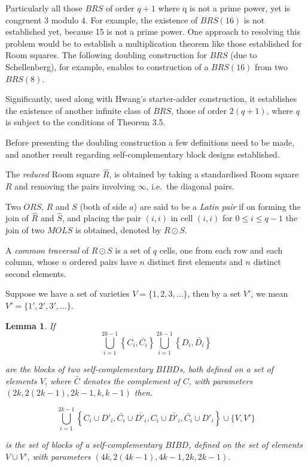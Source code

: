 \documentclass[
  11pt,
  a4paper]{book}
\newtheorem{lemma}[theorem]{Lemma}
\begin{document}
Particularly all those \(BRS\) of order \(q+1\) where q is not a
prime power, yet is congruent 3 modulo 4. For example, the
existence of \(BRS(16)\) is not established yet, because 15 is
not a prime power. One approach to resolving this problem
would be to establish a multiplication theorem like those
established for Room squares. The following doubling
construction for \(BRS\) (due to Schellenberg), for example,
enables to construction of a \(BRS(16)\) from two \(BRS(8)\).

Significantly, used along with Hwang's starter-adder
construction, it establishes the existence of another
infinite class of \(BRS\), those of order \(2(q+1)\), where \(q\)
is subject to the conditions of Theorem 3.5.

Before presenting the doubling construction a few
definitions need to be made, and another result regarding
self-complementary block designs established.

The \emph{reduced} Room square \(\hat{R}\), is obtained by taking a
standardised Room square \(R\) and removing the pairs
involving \(\infty\), i.e.~the diagonal pairs.

Two \(ORS\), \(R\) and \(S\) (both of side \(a\)) are said to be a
\emph{Latin pair} if on forming the join of \(\hat{R}\) and
\(\hat{S}\), and placing the pair \((i, i)\) in cell \((i, i)\) for
\(0 \leq i \leq q - 1\) the join of two \(MOLS\) is obtained,
denoted by \(R \odot S\).

A \emph{common traversal} of \(R \odot S\) is a set of \(q\) cells,
one from each row and each column, whose \(n\) ordered pairs
have \(n\) distinct first elements and \(n\) distinct second
elements.

Suppose we have a set of varieties \(V = \{1, 2, 3, \ldots\}\), then
by a set \(V'\), we mean \(V'=\{1', 2', 3', \ldots\}\).

\begin{lemma}
If
\begin{equation}
  \bigcup\limits_{i=1}^{2k-1} \left \{C_i,\bar{C_i} \right \} 
  \bigcup\limits_{i=1}^{2k-1} \left \{D_i,\bar{D_i} \right \}
\end{equation}

are the blocks of two self-complementary $BIBD$s, both
defined on a set of elements $V$, where $\bar{C}$ denotes
the complement of $C$, with parameters
$(2k, 2(2k - 1), 2k - 1, k, k-1)$ then.

\begin{equation}
\bigcup\limits_{i=1}^{2k-1} \left \{C_i \cup D'_i, \bar{C_i} \cup \bar{D'_i}, C_i \cup \bar{D'_i}, \bar{C_i} \cup D'_i  \right \} \cup \{V,V'\}
\end{equation}

is the set of blocks of a self-complementary $BIBD$, defined
on the set of elements $V \cup V'$, with parameters
$(4k, 2(4k - 1), 4k - 1, 2k, 2k - 1)$.
\end{lemma}
\end{document}
